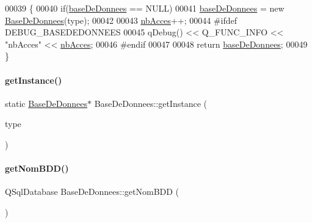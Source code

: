 \begin{DoxyCode}
00039 \{
00040     \textcolor{keywordflow}{if}(\hyperlink{class_base_de_donnees_a218c44b630523435e2f6f8f2f0c484f8}{baseDeDonnees} == NULL)
00041         \hyperlink{class_base_de_donnees_a218c44b630523435e2f6f8f2f0c484f8}{baseDeDonnees} = \textcolor{keyword}{new} \hyperlink{class_base_de_donnees_a10dd177f1008f675ab78c2221b2a6750}{BaseDeDonnees}(type);
00042 
00043     \hyperlink{class_base_de_donnees_a5d2e5264c826c6600fd20a9831fd1782}{nbAcces}++;
00044 \textcolor{preprocessor}{    #ifdef DEBUG\_BASEDEDONNEES}
00045     qDebug() << Q\_FUNC\_INFO << \textcolor{stringliteral}{"nbAcces"} << \hyperlink{class_base_de_donnees_a5d2e5264c826c6600fd20a9831fd1782}{nbAcces};
00046 \textcolor{preprocessor}{    #endif}
00047 
00048     \textcolor{keywordflow}{return} \hyperlink{class_base_de_donnees_a218c44b630523435e2f6f8f2f0c484f8}{baseDeDonnees};
00049 \}
\end{DoxyCode}
\mbox{\label{class_base_de_donnees_a55298012e86b8b56dc5c7ecd2fd49ffa}} 
\paragraph{\texorpdfstring{get\+Instance()}{getInstance()}\hspace{0.1cm}{\footnotesize\ttfamily [2/2]}}
{\footnotesize\ttfamily static \hyperlink{class_base_de_donnees}{Base\+De\+Donnees}$\ast$ Base\+De\+Donnees\+::get\+Instance (\begin{DoxyParamCaption}\item[{Q\+String}]{type }\end{DoxyParamCaption})\hspace{0.3cm}{\ttfamily [static]}}

\mbox{\label{class_base_de_donnees_a467909531ae3cdebaf173f6e97cdc624}} 
\paragraph{\texorpdfstring{get\+Nom\+B\+D\+D()}{getNomBDD()}}
{\footnotesize\ttfamily Q\+Sql\+Database Base\+De\+Donnees\+::get\+Nom\+B\+DD (\begin{DoxyParamCaption}{ }\end{DoxyParamCaption})\hspace{0.3cm}{\ttfamily [private]}}




